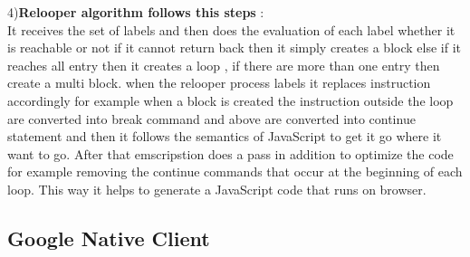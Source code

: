 \documentclass[23pt]{article}
\begin{document}
{4)\textbf{Relooper algorithm follows this steps} : \\
It receives the set of labels and then does the evaluation of each label whether it is reachable or not if it cannot return back then it simply creates a block else if it reaches all entry then it creates a loop , if there are more than one entry then create a multi block. when the relooper process labels it replaces instruction accordingly for example when a block is created  the instruction outside the loop are converted into break command and above are converted into continue statement and then it follows the semantics of JavaScript to get it go where it want to go. After that emscripstion does a pass in addition to optimize the code for example removing the continue commands that occur at the beginning of each loop. This way it helps to generate a JavaScript code that runs on browser. \cite{emsback} \par}
\subsection{Google Native Client}
\end{document}
